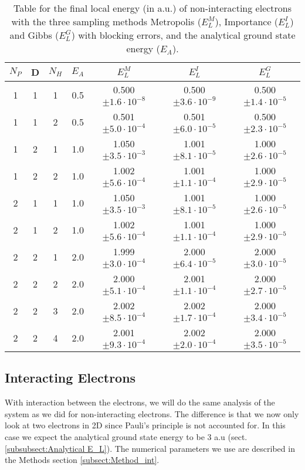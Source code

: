 \documentclass[12pt,a4paper,english]{article}
\begin{document}
\begin{table}[htbp!]
	\centering
	\begin{tabular}{ |c|c|c|c|c|c|c| }
		\hline \rule{0pt}{13pt}
		$N_P$ & D & $N_H$ & $E_A$ & $E_L^M$ & $E_L^I$ & $E_L^G$ \\
		\hline \rule{0pt}{13pt}%
		1 & 1 & 1 & 0.5 & 0.500$\pm1.6\cdot10^{-8}$ & 0.500$\pm3.6\cdot10^{-9}$ & 0.500$\pm1.4\cdot10^{-5}$ \\
		1 & 1 & 2 & 0.5 & 0.501$\pm5.0\cdot10^{-4}$ & 0.501$\pm6.0\cdot10^{-5}$ & 0.500$\pm2.3\cdot10^{-5}$ \\
		\hline \rule{0pt}{13pt}%
		1 & 2 & 1 & 1.0 & 1.050$\pm3.5\cdot10^{-3}$ & 1.001$\pm8.1\cdot10^{-5}$ & 1.000$\pm2.6\cdot10^{-5}$ \\
		1 & 2 & 2 & 1.0 & 1.002$\pm5.6\cdot10^{-4}$ & 1.001$\pm1.1\cdot10^{-4}$ & 1.000$\pm2.9\cdot10^{-5}$ \\
		\hline \rule{0pt}{13pt}%
		2 & 1 & 1 & 1.0 & 1.050$\pm3.5\cdot10^{-3}$ & 1.001$\pm8.1\cdot10^{-5}$ & 1.000$\pm2.6\cdot10^{-5}$ \\
		2 & 1 & 2 & 1.0 & 1.002$\pm5.6\cdot10^{-4}$ & 1.001$\pm1.1\cdot10^{-4}$ & 1.000$\pm2.9\cdot10^{-5}$ \\
		\hline \rule{0pt}{13pt}%
		2 & 2 & 1 & 2.0 & 1.999$\pm3.0\cdot10^{-4}$ & 2.000$\pm6.4\cdot10^{-5}$ & 2.000$\pm3.0\cdot10^{-5}$ \\
		2 & 2 & 2 & 2.0 & 2.000$\pm5.1\cdot10^{-4}$ & 2.001$\pm1.1\cdot10^{-4}$ & 2.000$\pm2.7\cdot10^{-5}$ \\
		2 & 2 & 3 & 2.0 & 2.002$\pm8.5\cdot10^{-4}$ & 2.002$\pm1.7\cdot10^{-4}$ & 2.000$\pm3.4\cdot10^{-5}$ \\
		2 & 2 & 4 & 2.0 & 2.001$\pm9.3\cdot10^{-4}$ & 2.002$\pm2.0\cdot10^{-4}$ & 2.000$\pm3.5\cdot10^{-5}$ \\
		\hline
	\end{tabular}	
	\caption{Table for the final local energy (in a.u.) of non-interacting electrons with the three sampling methods Metropolis ($E_L^M$), Importance ($E_L^I$) and Gibbs ($E_L^G$) with blocking errors, and the analytical ground state energy ($E_A$). \label{tab:Nonint_energies}}
\end{table}

\subsection{Interacting Electrons}
\label{subsect:Results_int}
With interaction between the electrons, we will do the same analysis of the system as we did for non-interacting electrons. The difference is that we now only look at two electrons in 2D since Pauli's principle is not accounted for. In this case we expect the analytical ground state energy to be 3 a.u (sect. \ref{subsubsect:Analytical E_L}). The numerical parameters we use are described in the Methods section \ref{subsect:Method_int}.
\end{document}
